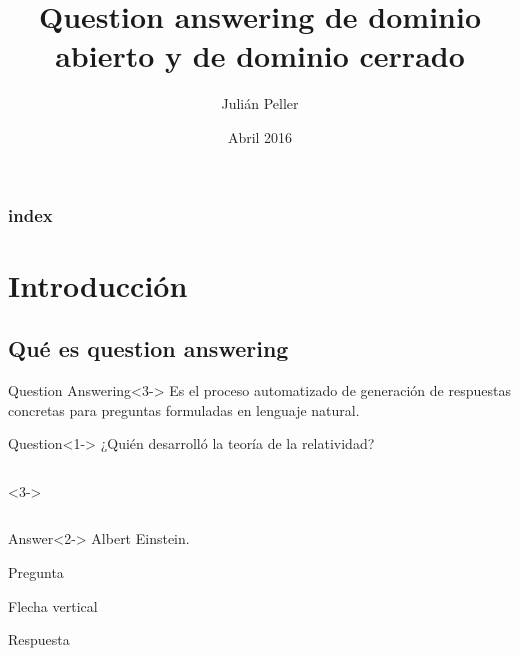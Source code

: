 \documentclass{beamer}
\title{Question answering de dominio abierto y de dominio cerrado}
\author{Julián Peller}
\date{Abril 2016} %
\begin{document}
\begin{frame}
  \titlepage
\end{frame}


\begin{frame}
  \frametitle{index}
  \tableofcontents[pausesections]
\end{frame}

\section{Introducción}

\subsection{Qué es question answering}
\begin{frame}
        \begin{block}{Question Answering}<3->
            Es el proceso automatizado de generación de respuestas concretas para preguntas formuladas en lenguaje natural.
        \end{block}
        \bigskip

       \begin{alertblock}{Question}<1->
            ¿Quién desarrolló la teoría de la relatividad?
        \end{alertblock}

        \begin{columns}<3->
            \begin{column}{.5\textwidth}
            \end{column}
            \begin{column}{.1\textwidth}
            \end{column}
            \begin{column}{.3\textwidth}
            \end{column}
            \begin{column}{.5\textwidth}

            \end{column}
        \end{columns}

        \begin{exampleblock}{Answer}<2->
            Albert Einstein.
        \end{exampleblock}
\end{frame}
\begin{frame}


\begin{block}{}
Pregunta
\end{block}
\medskip
Flecha vertical
\medskip
\begin{block}{}
Respuesta
\end{block}
\bigskip


\end{frame}
\end{document}
